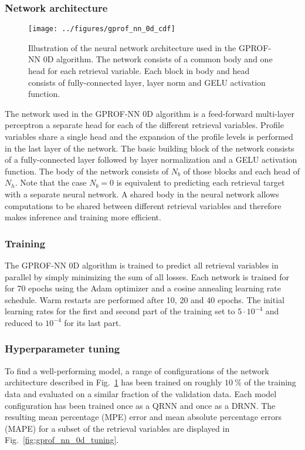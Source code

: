 \documentclass[a4paper,11pt,bibtotoc]{scrartcl}
\begin{document}
\subsubsection{Network architecture}

\begin{figure}[hbpt]
  \centering
    \texttt{[image: ../figures/gprof\_nn\_0d\_cdf]}
    \caption{Illustration of the neural network architecture used in the
      GPROF-NN 0D algorithm. The network consists of a common body and
      one head for each retrieval variable. Each block in body and head
      consists of fully-connected layer, layer norm and GELU activation function.
    }
  \label{fig:gprof_nn_0d}
\end{figure}

The network used in the GPROF-NN 0D algorithm is a feed-forward multi-layer
perceptron a  separate head for each of the different retrieval variables.
Profile variables share a single head and the expansion of the profile levels
is performed in the last layer of the network. The basic building block of
the network consists of a fully-connected layer followed by layer normalization
and a GELU activation function. The body of the network consists of
$N_b$ of those blocks and each head of $N_h$. Note that the case $N_b = 0$ is
equivalent to predicting each retrieval target with a separate neural network.
A shared body in the neural network allows computations to be shared between
different retrieval variables and therefore makes inference and training more
efficient.

\subsubsection{Training}

The GPROF-NN 0D algorithm is trained to predict all retrieval variables in
parallel by simply minimizing the sum of all losses. Each network is trained for
for 70 epochs using the Adam optimizer and a cosine annealing learning rate
schedule. Warm restarts are performed after 10, 20 and 40 epochs. The initial
learning rates for the first and second part of the training set to $5\cdot
10^{-4}$ and reduced to $10^{-4}$ for its last part.

\subsubsection{Hyperparameter tuning}

To find a well-performing model, a range of configurations of the network
architecture described in Fig.~\ref{fig:gprof_nn_0d} has been trained on roughly
$10\ \unit{\%}$ of the training data and evaluated on a similar fraction of the
validation data. Each model configuration has been trained once as a QRNN and
once as a DRNN. The resulting mean percentage (MPE) error and mean absolute
percentage errors (MAPE) for a subset of the retrieval variables are displayed
in Fig.~\ref{fig:gprof_nn_0d_tuning}.
\end{document}
